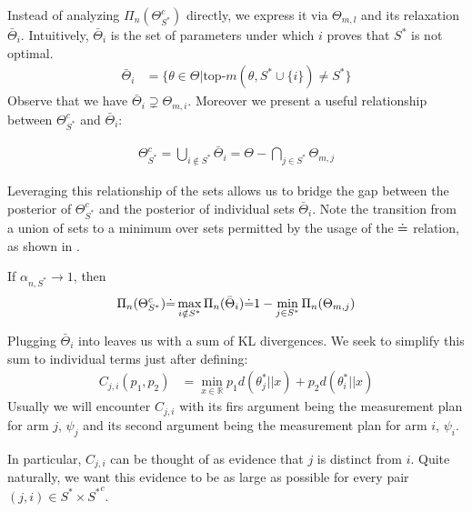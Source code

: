 Instead of analyzing $\Pi_n(\Theta_{S^*}^c)$ directly, we express it via
$\Theta_{m, l}$ and its relaxation $\bar{\Theta}_i$. Intuitively,
$\bar{\Theta}_i$ is the set of parameters under which $i$ proves that $S^*$ is
not optimal.
\begin{align}
  \bar{\Theta}_i &= \{ \theta \in \Theta | \text{top-}m(\theta, S^* \cup
      \{i\}) \neq S^*\}
\end{align}
Observe that we have $\bar{\Theta}_i \supsetneq \Theta_{m, i}$. Moreover we
present a useful relationship between $\Theta_{S^*}^c$ and $\bar{\Theta}_i$:
\begin{lemma}\label{lemma:set_relation_S*_i}
  \begin{align}
    \Theta_{S^*}^c = \bigcup_{i \notin S^*} \bar{\Theta}_i = \Theta -
        \bigcap_{j \in S^*} \Theta_{m, j}
  \end{align}
\end{lemma}
Leveraging this relationship of the sets allows us to bridge the gap between the
posterior of $\Theta_{S^*}^c$ and the posterior of individual sets
$\bar{\Theta}_i$. Note the transition from a union of sets to a minimum over
sets permitted by the usage of the $\dot{=}$ relation, as shown in
.
\begin{lemma}
  \label{lemma:posterior_S*_i} If $\alpha_{n, S^*} \rightarrow 1$, then
  \begin{align}
    \Pi_n(\Theta_{S^*}^c) \dot{=} \max_{i \notin S^*} \Pi_n(\bar{\Theta}_i) \dot{=} 1
        - \min_{j \in S^*} \Pi_n(\Theta_{m, j})
  \end{align}
\end{lemma}

Plugging $\bar{\Theta}_i$ into  leaves us with a sum of
KL divergences. We seek to simplify this sum to individual terms just after
defining:
\begin{align}
  C_{j, i}(p_1, p_2) &= \min_{x \in \mathbb{R}} p_1 d(\theta^*_{j} || x) + p_2
      d(\theta_{i}^* ||x) \label{eq:C}
\end{align}
Usually we will encounter $C_{j, i}$ with its firs argument being the
measurement plan for arm $j$, $\psi_j$ and its second argument being the
measurement plan for arm $i$, $\psi_i$.

In particular, $C_{j, i}$ can be thought of as evidence that $j$ is distinct
from $i$. Quite naturally, we want this evidence to be as large as possible for
every pair $(j, i) \in S^* \times {S^*}^c$.


